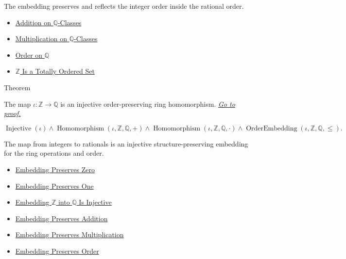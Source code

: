 \begin{remark*}[Interpretation]
The embedding preserves and reflects the integer order inside the rational
order.
\end{remark*}

\begin{dependencies}
\begin{itemize}
  \item \hyperref[def:addition-on-q-classes]{Addition on $\mathbb{Q}$-Classes}
  \item \hyperref[def:multiplication-on-q-classes]{Multiplication on $\mathbb{Q}$-Classes}
  \item \hyperref[def:order-on-q]{Order on $\mathbb{Q}$}
  \item \hyperref[thm:z-totally-ordered-set]{$\mathbb{Z}$ Is a Totally Ordered Set}
\end{itemize}
\end{dependencies}

\begin{theorembox}{Theorem}
\begin{theorem}
\label{thm:z-embeds-into-q}
The map $\iota:\mathbb{Z}\to\mathbb{Q}$ is an injective order-preserving ring
homomorphism.
\hyperref[prf:z-embeds-into-q]{\textit{Go to proof.}}
\end{theorem}
\end{theorembox}

\begin{remark*}
\[
\operatorname{Injective}(\iota)
\land
\operatorname{Homomorphism}(\iota,\mathbb{Z},\mathbb{Q},+)
\land
\operatorname{Homomorphism}(\iota,\mathbb{Z},\mathbb{Q},\cdot)
\land
\operatorname{OrderEmbedding}(\iota,\mathbb{Z},\mathbb{Q},\le).
\]
\end{remark*}

\begin{remark*}[Interpretation]
The map from integers to rationals is an injective structure-preserving
embedding for the ring operations and order.
\end{remark*}

\begin{dependencies}
\begin{itemize}
  \item \hyperref[thm:embedding-z-into-q-preserves-zero]{Embedding Preserves Zero}
  \item \hyperref[thm:embedding-z-into-q-preserves-one]{Embedding Preserves One}
  \item \hyperref[thm:embedding-z-into-q-injective]{Embedding $\mathbb{Z}$ into $\mathbb{Q}$ Is Injective}
  \item \hyperref[thm:embedding-z-into-q-preserves-addition]{Embedding Preserves Addition}
  \item \hyperref[thm:embedding-z-into-q-preserves-multiplication]{Embedding Preserves Multiplication}
  \item \hyperref[thm:embedding-z-into-q-preserves-order]{Embedding Preserves Order}
\end{itemize}
\end{dependencies}


